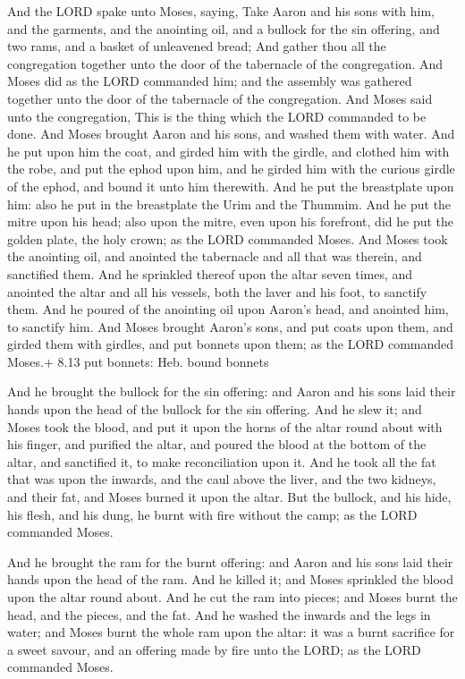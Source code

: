  And the LORD spake unto Moses, saying,  Take
Aaron and his sons with him, and the garments, and the anointing oil,
and a bullock for the sin offering, and two rams, and a basket of
unleavened bread;  And gather thou all the congregation
together unto the door of the tabernacle of the congregation.
 And Moses did as the LORD commanded him; and the assembly
was gathered together unto the door of the tabernacle of the
congregation.  And Moses said unto the congregation, This is
the thing which the LORD commanded to be done.  And Moses
brought Aaron and his sons, and washed them with water.  And
he put upon him the coat, and girded him with the girdle, and clothed
him with the robe, and put the ephod upon him, and he girded him with
the curious girdle of the ephod, and bound it unto him therewith.
 And he put the breastplate upon him: also he put in the
breastplate the Urim and the Thummim.  And he put the mitre
upon his head; also upon the mitre, even upon his forefront, did he put
the golden plate, the holy crown; as the LORD commanded Moses.
 And Moses took the anointing oil, and anointed the
tabernacle and all that was therein, and sanctified them. 
And he sprinkled thereof upon the altar seven times, and anointed the
altar and all his vessels, both the laver and his foot, to sanctify
them.  And he poured of the anointing oil upon Aaron's
head, and anointed him, to sanctify him.  And Moses brought
Aaron's sons, and put coats upon them, and girded them with girdles, and
put bonnets upon them; as the LORD commanded Moses.+ 8.13 put bonnets:
Heb. bound bonnets

 And he brought the bullock for the sin offering: and Aaron
and his sons laid their hands upon the head of the bullock for the sin
offering.  And he slew it; and Moses took the blood, and
put it upon the horns of the altar round about with his finger, and
purified the altar, and poured the blood at the bottom of the altar, and
sanctified it, to make reconciliation upon it.  And he took
all the fat that was upon the inwards, and the caul above the liver, and
the two kidneys, and their fat, and Moses burned it upon the altar.
 But the bullock, and his hide, his flesh, and his dung, he
burnt with fire without the camp; as the LORD commanded Moses.

 And he brought the ram for the burnt offering: and Aaron
and his sons laid their hands upon the head of the ram. 
And he killed it; and Moses sprinkled the blood upon the altar round
about.  And he cut the ram into pieces; and Moses burnt the
head, and the pieces, and the fat.  And he washed the
inwards and the legs in water; and Moses burnt the whole ram upon the
altar: it was a burnt sacrifice for a sweet savour, and an offering made
by fire unto the LORD; as the LORD commanded Moses.

